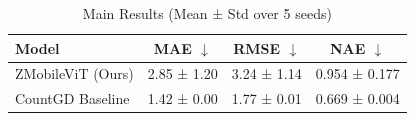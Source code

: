 \begin{table}[h]
\centering
\caption{Main Results (Mean ± Std over 5 seeds)}
\begin{tabular}{lccc}
\toprule
Model & MAE $\downarrow$ & RMSE $\downarrow$ & NAE $\downarrow$ \\
\midrule
ZMobileViT (Ours) & 2.85 ± 1.20 & 3.24 ± 1.14 & 0.954 ± 0.177 \\
CountGD Baseline & 1.42 ± 0.00 & 1.77 ± 0.01 & 0.669 ± 0.004 \\
\bottomrule
\end{tabular}
\end{table}
